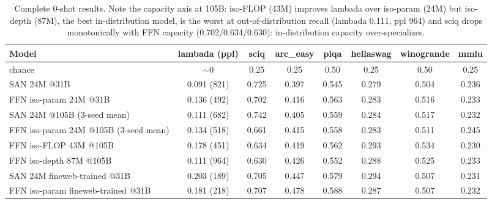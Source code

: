 \begin{table}[t]\centering\small
\begin{tabular}{lccccccc}
\toprule
Model & lambada (ppl) & sciq & arc\_easy & piqa & hellaswag & winogrande & mmlu \\
\midrule
chance & $\sim$0 & 0.25 & 0.25 & 0.50 & 0.25 & 0.50 & 0.25 \\
\midrule
SAN 24M @31B & 0.091 (821) & 0.725 & 0.397 & 0.545 & 0.279 & 0.504 & 0.236 \\
FFN iso-param 24M @31B & 0.136 (492) & 0.702 & 0.416 & 0.563 & 0.283 & 0.516 & 0.233 \\
SAN 24M @105B (3-seed mean) & 0.111 (682) & 0.742 & 0.405 & 0.559 & 0.284 & 0.517 & 0.232 \\
FFN iso-param 24M @105B (3-seed mean) & 0.134 (518) & 0.661 & 0.415 & 0.558 & 0.283 & 0.511 & 0.245 \\
FFN iso-FLOP 43M @105B & 0.178 (451) & 0.634 & 0.419 & 0.562 & 0.293 & 0.534 & 0.230 \\
FFN iso-depth 87M @105B & 0.111 (964) & 0.630 & 0.426 & 0.552 & 0.288 & 0.525 & 0.233 \\
SAN 24M fineweb-trained @31B & 0.203 (189) & 0.705 & 0.447 & 0.579 & 0.294 & 0.507 & 0.231 \\
FFN iso-param fineweb-trained @31B & 0.181 (218) & 0.707 & 0.478 & 0.588 & 0.287 & 0.507 & 0.232 \\
\bottomrule
\end{tabular}
\caption{Complete 0-shot results. Note the capacity axis at 105B: iso-FLOP
(43M) improves lambada over iso-param (24M) but iso-depth (87M), the best
in-distribution model, is the worst at out-of-distribution recall
(lambada 0.111, ppl 964) and sciq drops monotonically with FFN capacity
(0.702/0.634/0.630): in-distribution capacity over-specializes.}
\label{tab:downstream_full}
\end{table}
